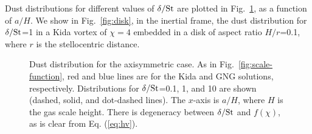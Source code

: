 \documentclass[apj]{emulateapj}
\newcommand{\Eq}[1]{Eq. (\ref{#1})}
\newcommand{\eq}[1]{\Eq{#1}}
\newcommand{\Fig}[1]{Fig.~\ref{#1}}
\newcommand{\fig}[1]{\Fig{#1}}
\newcommand{\St}{{\rm St}}
\begin{document}
Dust distributions for different values of $\delta/\St$ are plotted in \fig{fig:gaussian}, as a 
function of $a/H$. We show in \fig{fig:disk}, in the inertial frame, 
the dust distribution for $\delta/\St$=1 in a Kida vortex of $\chi=4$ embedded in a 
disk of aspect ratio $H/r$=0.1, where $r$ is the stellocentric distance. 

\begin{figure}
  \begin{center}
  \end{center}
\caption[]{Dust distribution for the axisymmetric case. As in
  \fig{fig:scale-function}, red and blue lines are for the Kida and
  GNG solutions, respectively. Distributions for $\delta/\St$=0.1, 1, and
  10 are shown (dashed, solid, and dot-dashed lines). The $x$-axis is
  $a/H$, where $H$ is the gas scale height. There is degeneracy
  between $\delta/\St$ and $f(\chi)$, as is clear from \eq{eq:hv}.}
 \label{fig:gaussian}
\end{figure}
\end{document}
